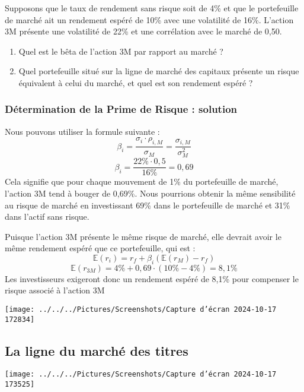 \documentclass[a4paper, 12pt]{report}
\begin{document}
Supposons que le taux de rendement sans risque soit de 4\% et que le portefeuille de marché ait un rendement espéré de 10\% avec une volatilité de 16\%. L'action 3M présente une volatilité de 22\% et une corrélation avec le marché de 0,50. 

\begin{enumerate}
	\item Quel est le bêta de l'action 3M par rapport au marché ?
	\item Quel portefeuille situé sur la ligne de marché des capitaux présente un risque équivalent à celui du marché, et quel est son rendement espéré ?
\end{enumerate}

\subsubsection{Détermination de la Prime de Risque : solution}

Nous pouvons utiliser la formule suivante :
\[
\beta_i = \frac{\sigma_i \cdot \rho_{i,M}}{\sigma_M} = \frac{\sigma_{i,M}}{\sigma_M^2}
\]
\[
\beta_i = \frac{22\% \cdot 0,5}{16\%} = 0,69
\]
Cela signifie que pour chaque mouvement de 1\% du portefeuille de marché, l'action 3M tend à bouger de 0,69\%. Nous pourrions obtenir la même sensibilité au risque de marché en investissant 69\% dans le portefeuille de marché et 31\% dans l'actif sans risque.

Puisque l'action 3M présente le même risque de marché, elle devrait avoir le même rendement espéré que ce portefeuille, qui est :
\[
\mathbb{E}(r_i) = r_f + \beta_i (\mathbb{E}(r_M) - r_f)
\]
\[
\mathbb{E}(r_{3M}) = 4\% + 0,69 \cdot (10\% - 4\%) = 8,1\%
\]
Les investisseurs exigeront donc un rendement espéré de 8,1\% pour compenser le risque associé à l'action 3M

\begin{center}
\texttt{[image: ../../../Pictures/Screenshots/Capture d'écran 2024-10-17 172834]}
\end{center}

\subsection{La ligne du marché des titres}


\begin{center}
	\texttt{[image: ../../../Pictures/Screenshots/Capture d'écran 2024-10-17 173525]}
\end{center}
\end{document}
